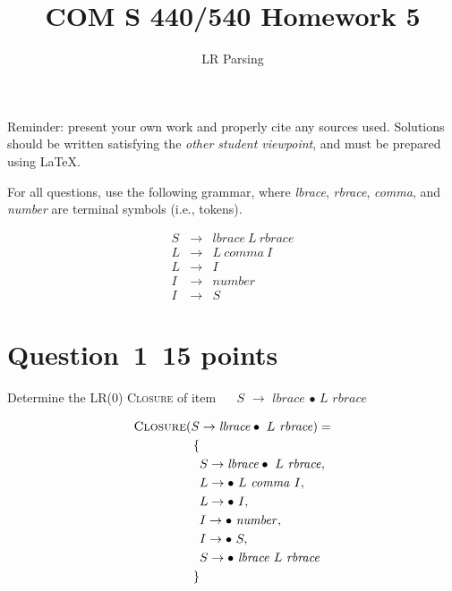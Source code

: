 \documentclass[10pt]{article}
\title{COM S 440/540 Homework 5}
\date{}
\author{LR Parsing}
\begin{document}
\maketitle

\noindent
Reminder: present your own work and properly cite any sources used.
Solutions should be written satisfying the \emph{other student viewpoint},
and must be prepared using \LaTeX.
\renewcommand{\thepage}{~}
 
 
For all questions, use the following grammar, where
\emph{lbrace}, \emph{rbrace}, \emph{comma}, and \emph{number}
are terminal symbols (i.e., tokens).

\begin{eqnarray}
  S & \rightarrow & \mathit{lbrace} ~L~ \mathit{rbrace}
\\
  L & \rightarrow & L ~\mathit{comma}~ I
\\
  L & \rightarrow & I
\\
  I & \rightarrow & \mathit{number}
\\
  I & \rightarrow & S
\end{eqnarray}


\section*{Question~1~\hfill 15 points}

Determine the LR(0) \textsc{Closure} of item ~~
$S$ $\rightarrow$ $\mathit{lbrace}$ $\bullet$ $L$ $\mathit{rbrace}$
\begin{framed}
\begin{align*}
\textsc{Closure}(S &\rightarrow \mathit{lbrace} \bullet \  L \  \mathit{rbrace}) = \\
\{ \\
  & S \rightarrow \mathit{lbrace} \bullet \  L \  \mathit{rbrace}, \\
  & L \rightarrow \bullet \  L \ \mathit{comma} \ I, \\
  & L \rightarrow \bullet \  I, \\
  & I \rightarrow \bullet \ \mathit{number}, \\
  & I \rightarrow \bullet \ S, \\
  & S \rightarrow \bullet \ \mathit{lbrace} \  L \  \mathit{rbrace} \\
\}
\end{align*}
\end{framed}
\end{document}
